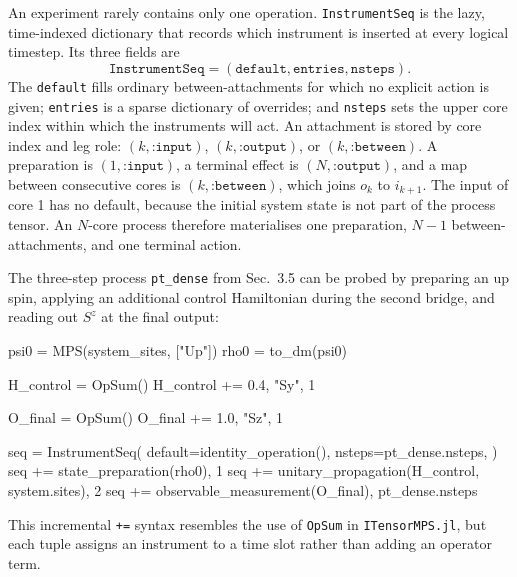 An experiment rarely contains only one operation.
\texttt{InstrumentSeq} is the lazy, time-indexed dictionary that records which instrument is inserted at every logical timestep.
Its three fields are
%
\begin{equation}
    \texttt{InstrumentSeq}
    = (\texttt{default},\texttt{entries},\texttt{nsteps}).
    \label{eq:instrument-seq-fields}
\end{equation}
%
The \texttt{default} fills ordinary between-attachments for which no explicit action is given; \texttt{entries} is a sparse dictionary of overrides; and \texttt{nsteps} sets the upper core index within which the instruments will act.
An attachment is stored by core index and leg role: \((k,\texttt{:input})\), \((k,\texttt{:output})\), or \((k,\texttt{:between})\).
A preparation is \((1,\texttt{:input})\), a terminal effect is \((N,\texttt{:output})\), and a map between consecutive cores is \((k,\texttt{:between})\), which joins \(o_k\) to \(i_{k+1}\).
The input of core 1 has no default, because the initial system state is not part of the process tensor.
An \(N\)-core process therefore materialises one preparation, \(N-1\) between-attachments, and one terminal action.

The three-step process \texttt{pt\_dense} from Sec.~3.5 can be probed by preparing an up spin, applying an additional control Hamiltonian during the second bridge, and reading out \(S^z\) at the final output:

%
\begin{juliacode}[
    caption={A lazy instrument schedule for a controlled three-step experiment.},
    label={lst:instrument-seq-example},
]
psi0 = MPS(system_sites, ["Up"])
rho0 = to_dm(psi0)

H_control = OpSum()
H_control += 0.4, "Sy", 1

O_final = OpSum()
O_final += 1.0, "Sz", 1

seq = InstrumentSeq(
    default=identity_operation(),
    nsteps=pt_dense.nsteps,
)
seq += state_preparation(rho0), 1
seq += unitary_propagation(H_control, system.sites), 2
seq += observable_measurement(O_final), pt_dense.nsteps
\end{juliacode}
%

This incremental \texttt{+=} syntax resembles the use of \texttt{OpSum} in \texttt{ITensorMPS.jl}, but each tuple assigns an instrument to a time slot rather than adding an operator term.

